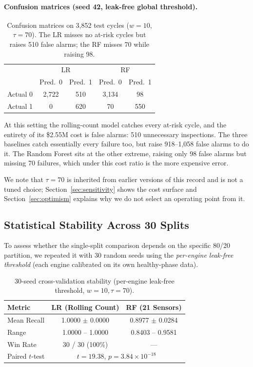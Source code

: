 \documentclass[10pt,twocolumn]{article}
\begin{document}
\paragraph{Confusion matrices (seed 42, leak-free global threshold).}

\begin{table}[h]
\centering
\caption{Confusion matrices on 3,852 test cycles ($w=10$, $\tau=70$).
The LR misses no at-risk cycles but raises 510 false alarms; the RF misses 70 while
raising 98.}
\label{tab:cm}
\vspace{4pt}
\small
\begin{tabular}{lcc|cc}
\toprule
 & \multicolumn{2}{c|}{LR} & \multicolumn{2}{c}{RF} \\
 & Pred.\ 0 & Pred.\ 1 & Pred.\ 0 & Pred.\ 1 \\
\midrule
Actual 0 & 2,722 & 510 & 3,134 & 98 \\
Actual 1 & 0 & 620 & 70 & 550 \\
\bottomrule
\end{tabular}
\end{table}

At this setting the rolling-count model catches every at-risk cycle, and the entirety
of its \$2.55M cost is false alarms: 510 unnecessary inspections. The three baselines
catch essentially every failure too, but raise 918--1,058 false alarms to do it. The
Random Forest sits at the other extreme, raising only 98 false alarms but missing 70
failures, which under this cost ratio is the more expensive error.

We note that $\tau=70$ is inherited from earlier versions of this record and is not a
tuned choice; Section~\ref{sec:sensitivity} shows the cost surface and
Section~\ref{sec:optimism} explains why we do not select an operating point from it.

\subsection{Statistical Stability Across 30 Splits}

To assess whether the single-split comparison depends on the specific 80/20 partition,
we repeated it with 30 random seeds using the \textit{per-engine leak-free threshold}
(each engine calibrated on its own healthy-phase data).

\begin{table}[h]
\centering
\caption{30-seed cross-validation stability (per-engine leak-free threshold, $w=10, \tau=70$).}
\label{tab:stability}
\vspace{4pt}
\begin{tabular}{lcc}
\toprule
Metric & LR (Rolling Count) & RF (21 Sensors) \\
\midrule
Mean Recall & 1.0000 $\pm$ 0.0000 & 0.8977 $\pm$ 0.0284 \\
Range & 1.0000 -- 1.0000 & 0.8403 -- 0.9581 \\
Win Rate & 30 / 30 (100\%) & --- \\
Paired $t$-test & \multicolumn{2}{c}{$t = 19.38$, \quad $p = 3.84\times10^{-18}$} \\
\bottomrule
\end{tabular}
\end{table}
\end{document}
